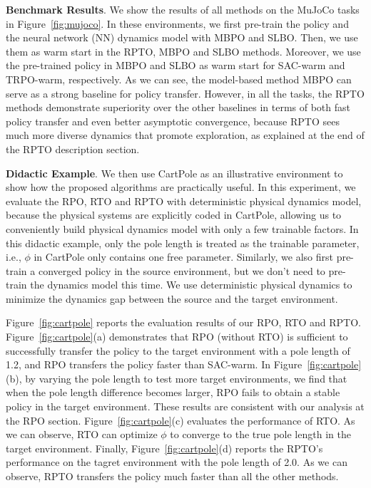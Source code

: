 \documentclass[letterpaper]{article} %
\begin{document}
\textbf{Benchmark Results}.
We show the results of all methods on the MuJoCo tasks in Figure~\ref{fig:mujoco}.
In these environments, we first pre-train the policy and the neural network (NN) dynamics model with MBPO and SLBO. Then, we use them as warm start in the RPTO, MBPO and SLBO methods.
Moreover, we use the pre-trained policy in MBPO and SLBO as warm start for SAC-warm and TRPO-warm, respectively.
As we can see, the model-based method MBPO can serve as a strong baseline for policy transfer.
However, in all the tasks, the RPTO methods demonstrate superiority over the other baselines in terms of both fast policy transfer and even better asymptotic convergence, because RPTO sees much more diverse dynamics that promote exploration, as explained at the end of the RPTO description section.



\textbf{Didactic Example}.
We then use CartPole as an illustrative environment to show how the proposed algorithms are practically useful.
In this experiment, we evaluate the RPO, RTO and RPTO with deterministic physical dynamics model, because the physical systems are explicitly coded in CartPole, allowing us to conveniently build physical dynamics model with only a few trainable factors.
In this didactic example, only the pole length is treated as the trainable parameter, i.e., $\phi$ in CartPole only contains one free parameter.
Similarly, we also first pre-train a converged policy in the source environment, but we don't need to pre-train the dynamics model this time.
We use deterministic physical dynamics to minimize the dynamics gap between the source and the target environment.

Figure~\ref{fig:cartpole} reports the evaluation results of our RPO, RTO and RPTO. Figure~\ref{fig:cartpole}(a) demonstrates that RPO (without RTO) is sufficient to successfully transfer the policy to the target environment with a pole length of 1.2, and RPO transfers the policy faster than SAC-warm. In Figure~\ref{fig:cartpole}(b), by varying the pole length to test more target environments, we find that when the pole length difference becomes larger, RPO fails to obtain a stable policy in the target environment.
These results are consistent with our analysis at the RPO section.
Figure~\ref{fig:cartpole}(c) evaluates the performance of RTO. As we can observe, RTO can optimize $\phi$ to converge to the true pole length in the target environment.
Finally, Figure~\ref{fig:cartpole}(d) reports the RPTO's performance on the tagret environment with the pole length of 2.0.
As we can observe, RPTO transfers the policy much faster than all the other methods.
\end{document}
